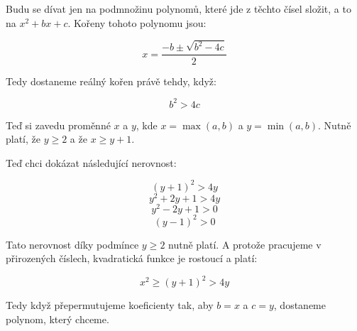 \documentclass{fkssolpub}
\author{Ondřej Sedláček}
\begin{document}
Budu se dívat jen na podmnožinu polynomů, které jde z těchto čísel složit, a to na $x^2 + b x + c$. Kořeny tohoto polynomu jsou:

\[
  x = \frac{-b \pm \sqrt{b^2 - 4c}}{2}
\]

Tedy dostaneme reálný kořen právě tehdy, když:

\[
  b^2 > 4c
\]

Teď si zavedu proměnné $x$ a $y$, kde $x = \max(a,b)$ a $y = \min(a,b)$. Nutně platí, že $y \geq 2$ a že $x \geq y + 1$.

Teď chci dokázat následující nerovnost:

\[
  (y + 1)^2 > 4y
\]
\[
  y^2 + 2y + 1 > 4y
\]
\[
  y^2 - 2y + 1 > 0
\]
\[
  (y - 1)^2 > 0
\]

Tato nerovnost díky podmínce $y \geq 2$ nutně platí. A protože pracujeme v přirozených číslech, kvadratická funkce je rostoucí a platí:

\[
  x^2 \geq (y + 1)^2 > 4y
\]

Tedy když přepermutujeme koeficienty tak, aby $b = x$ a $c = y$, dostaneme polynom, který chceme.
\end{document}
